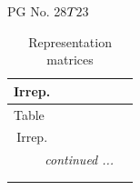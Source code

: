 \documentclass[fleqn,8pt,landscape]{jsarticle}
\begin{document}
\setcounter{MaxMatrixCols}{32}

\renewcommand{\tablename}{Table~}
\renewcommand{\figurename}{Figure~}
\begin{center}
\LARGE
PG No. 28\quad$T_{\rm }$\quad$23$\quad[ cubic ]
\end{center}
\renewcommand{\arraystretch}{1.2}
\begin{longtable}{ccccccc}
\caption{Representation matrices}
 \\
 \hline \hline
Irrep. &  &  &  &  &  &  \\ \hline \endfirsthead

\multicolumn{6}{l}{\tablename\ \thetable{}} \\
 \hline \hline
Irrep. &  &  &  &  &  &  \\ \hline \endhead

 \hline \hline
\multicolumn{6}{r}{\footnotesize\it continued ...} \\ \endfoot

 \hline \hline
\multicolumn{6}{r}{} \\ \endlastfoot


\end{longtable}
\end{document}
